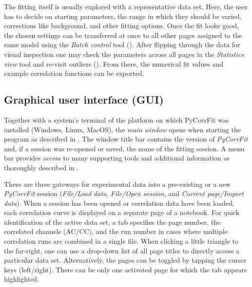 The fitting itself is usually explored with a representative data set. Here, the user has to decide on starting parameters, the range in which they should be varied, corrections like background, and other fitting options. Once the fit looks good, the chosen settings can be transferred at once to all other pages assigned to the same model using the \textit{Batch control} tool (). After flipping through the data for visual inspection one may check the parameters across all pages in the \textit{Statistics view} tool and re-visit outliers (). From there, the numerical fit values and example correlation functions can be exported.

\subsection{Graphical user interface (GUI)}
\label{sec:intro.graph}



Together with a system's terminal of the platform on which PyCorrFit was installed (Windows, Linux, MacOS), the \textit{main window} opens when starting the program as described in . The window title bar contains the version of \textit{PyCorrFit} and, if a session was re-opened or saved, the name of the fitting session. A menu bar provides access to many supporting tools and additional information as thoroughly described in . 

There are three gateways for experimental data into a pre-existing or a new \textit{PyCorrFit} session (\textit{File/Load data}, \textit{File/Open session}, and \textit{Current page/Import data}). When a session has been opened or correlation data have been loaded, each correlation curve is displayed on a separate page of a notebook. For quick identification of the active data set, a tab specifies the page number, the correlated channels (AC/CC), and the run number in cases where  multiple correlation runs are combined in a single file. When clicking a little triangle to the far-right, one can use a drop-down list of all page titles to directly access a particular data set. Alternatively, the pages can be toggled by tapping the curser keys (left/right). There can be only one activated page for which the tab appears highlighted.

